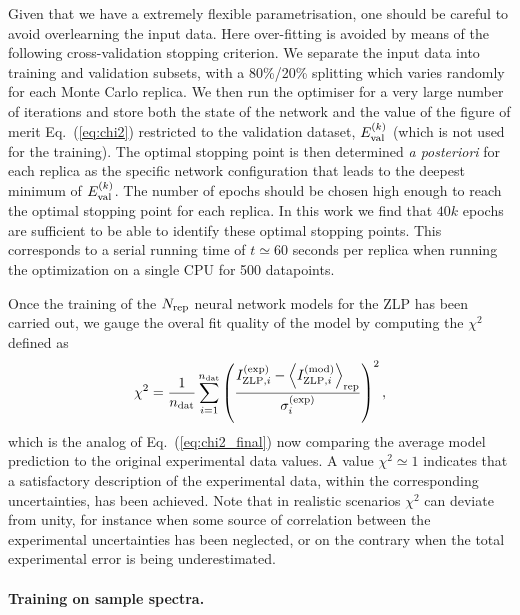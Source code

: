 Given that we have a extremely flexible parametrisation, one should be careful
to avoid overlearning the input data.
%
Here over-fitting is avoided by means of the following cross-validation stopping criterion.
%
We separate the input data into training and validation subsets, with a 80\%/20\% splitting
which varies randomly for each Monte Carlo replica.
%
We then run the optimiser for a very large number of iterations and store both
the state of the network and the value
of the figure of merit Eq.~(\ref{eq:chi2}) restricted to the validation
dataset, $E^{(k)}_{\rm val}$ (which is not used for the training).
%
The optimal stopping point is then determined {\it a posteriori} for each replica
as the specific network configuration that leads to the deepest minimum of $E^{(k)}_{\rm val}$.
%
The number of epochs should be chosen high enough to reach the optimal stopping point for each replica.
%
In this work we find that $40k$ epochs are sufficient to be able to identify these optimal stopping points.
%
This corresponds to a serial running time of 
$t\simeq 60$ seconds per replica when running the optimization on a  single CPU for 500 datapoints.

Once the training of the $N_{\rm rep}$ neural network models for the ZLP has been carried out,
we gauge the overal fit quality of the model by computing the
$\chi^2$ defined as
\begin{equation}
  \label{eq:chi2_final}
\begin{centering}
  \chi^2 = \frac{1}{n_{\rm dat}}\sum_{i=1}^{n_{\rm dat}}\left(\frac{ I_{{\rm ZLP},i}^{{\rm (exp)}} -
 \la I_{{\rm ZLP},i}^{{\rm (mod)}}\ra_{\rm rep} }{\sigma_i^{(\rm exp)}}\right)^2, 
\end{centering}
\end{equation}
which is the analog of Eq.~(\ref{eq:chi2_final}) now comparing the average model prediction
to the original experimental data values.
%
A value $\chi^2 \simeq 1$ indicates that a satisfactory description of the experimental data,
within the corresponding uncertainties, has been achieved.
%
Note that in realistic scenarios $\chi^2$ can deviate from unity, for instance when
some source of correlation between the experimental uncertainties has been neglected, or on the contrary
when the total experimental error is being underestimated.

\paragraph{Training on sample spectra.}

